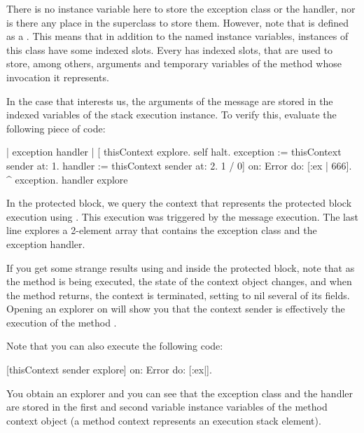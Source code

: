 There is no instance variable here to store the exception class or the handler, nor is there any place in the superclass to store them. 
However, note that  is defined as a .
This means that in addition to the named instance variables, instances of this class have some indexed slots.  Every  has indexed slots, that are used to store, among others, arguments and temporary variables of the method whose invocation it represents. 

In the case that interests us, the arguments of the  message are stored in the indexed variables of the stack execution instance. To verify this, evaluate the following piece of code:


\begin{code}{}
| exception handler |
	[ thisContext  explore. 
	self halt.
	exception := thisContext  sender at: 1.
	handler := thisContext sender at: 2.
	1 / 0]
		on: Error
		do: [:ex | 666].
	^ {exception. handler} explore
\end{code}

In the protected block, we query the context that represents the protected block execution using . This execution was triggered by the  message execution. The last line explores a 2-element array that contains the exception class and the exception handler. 

If you get some strange results using  and  inside the protected block, note that as the method is being executed, the state of the context object changes, and when the method returns, the context is terminated, setting to nil several of its fields. Opening an explorer on  will show you that the context sender is effectively the execution of the method . 

Note that you can also execute the following code:
\begin{code}{}
[thisContext sender explore] on: Error do: [:ex|].
\end{code}

You obtain an explorer and you can see that the exception class and the handler are stored in the first and second variable instance variables of the method context object (a method context represents an execution stack element).


